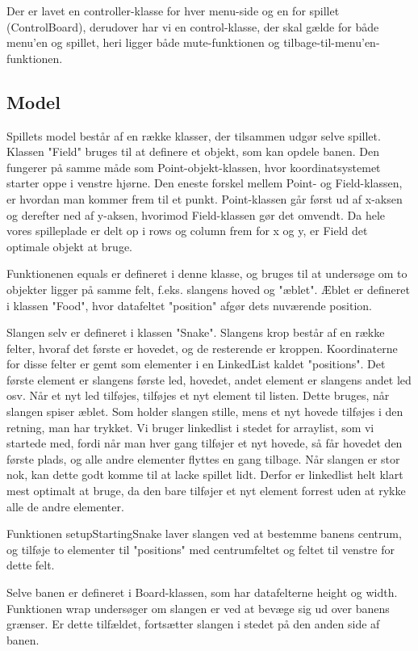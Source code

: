 \documentclass{report}
\begin{document}
Der er lavet en controller-klasse for hver menu-side og en for spillet (ControlBoard), derudover har vi en control-klasse, der skal gælde for både menu'en og spillet, heri ligger både mute-funktionen og tilbage-til-menu'en-funktionen.

\subsection{Model}
Spillets model består af en række klasser, der tilsammen udgør selve spillet.
Klassen "Field" bruges til at definere et objekt, som kan opdele banen. Den fungerer på samme måde som Point-objekt-klassen, hvor koordinatsystemet starter oppe i venstre hjørne. Den eneste forskel mellem Point- og Field-klassen, er hvordan man kommer frem til et punkt. Point-klassen går først ud af x-aksen og derefter ned af y-aksen, hvorimod Field-klassen gør det omvendt. Da hele vores spilleplade er delt op i rows og column frem for x og y, er Field det optimale objekt at bruge.
\linebreak

Funktionenen equals er defineret i denne klasse, og bruges til at undersøge om to objekter ligger på samme felt, f.eks. slangens hoved og "æblet". Æblet er defineret i klassen "Food", hvor datafeltet "position" afgør dets nuværende position. 

Slangen selv er defineret i klassen "Snake". Slangens krop består af en række felter, hvoraf det første er hovedet, og de resterende er kroppen. Koordinaterne for disse felter er gemt som elementer i en LinkedList kaldet "positions". Det første element er slangens første led, hovedet, andet element er slangens andet led osv. Når et nyt led tilføjes, tilføjes et nyt element til listen. Dette bruges, når slangen spiser æblet. Som holder slangen stille, mens et nyt hovede tilføjes i den retning, man har trykket. 
Vi bruger linkedlist i stedet for arraylist, som vi startede med, fordi når man hver gang tilføjer et nyt hovede, så får hovedet den første plads, og alle andre elementer flyttes en gang tilbage. Når slangen er stor nok, kan dette godt komme til at lacke spillet lidt. Derfor er linkedlist helt klart mest optimalt at bruge, da den bare tilføjer et nyt element forrest uden at rykke alle de andre elementer.

Funktionen setupStartingSnake laver slangen ved at bestemme banens centrum, og tilføje to elementer til "positions" med centrumfeltet og feltet til venstre for dette felt.

Selve banen er defineret i Board-klassen, som har datafelterne height og width. Funktionen wrap undersøger om slangen er ved at bevæge sig ud over banens grænser. Er dette tilfældet, fortsætter slangen i stedet på den anden side af banen.
\end{document}

